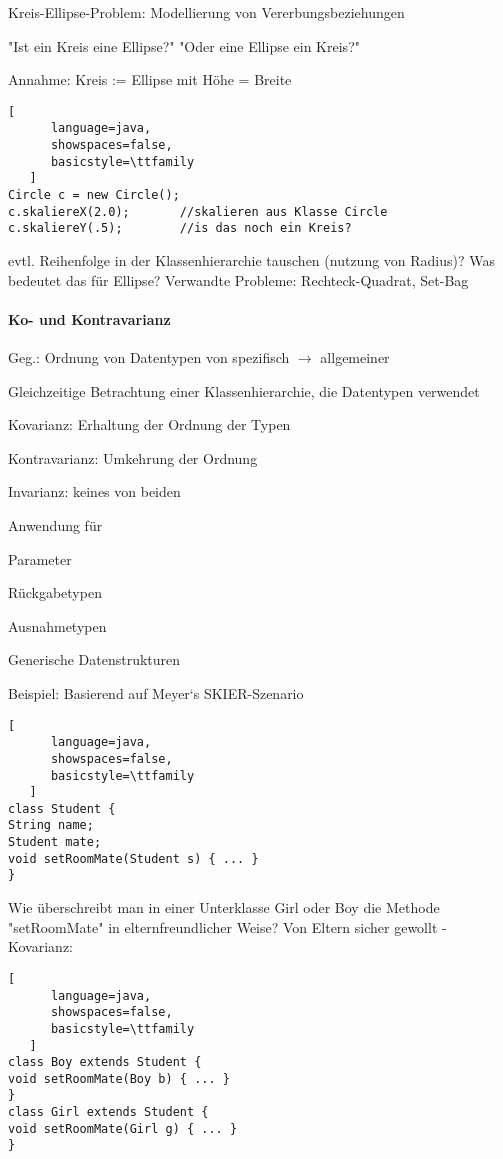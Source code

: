 \documentclass[10pt]{article}
\begin{document}
Kreis-Ellipse-Problem: Modellierung von Vererbungsbeziehungen
\begin{itemize*}
  \item "Ist ein Kreis eine Ellipse?" "Oder eine Ellipse ein Kreis?"
  \item Annahme: Kreis := Ellipse mit Höhe = Breite
\end{itemize*}
\begin{lstlisting}[
      language=java,
      showspaces=false,
      basicstyle=\ttfamily
   ]
Circle c = new Circle();  
c.skaliereX(2.0);       //skalieren aus Klasse Circle
c.skaliereY(.5);        //is das noch ein Kreis?
\end{lstlisting}

evtl. Reihenfolge in der Klassenhierarchie tauschen (nutzung von Radius)? Was bedeutet das für Ellipse?
Verwandte Probleme: Rechteck-Quadrat, Set-Bag

\paragraph{Ko- und Kontravarianz}
Geg.: Ordnung von Datentypen von spezifisch $\rightarrow$ allgemeiner
\begin{itemize*}
  \item Gleichzeitige Betrachtung einer Klassenhierarchie, die Datentypen verwendet
  \item Kovarianz: Erhaltung der Ordnung der Typen
  \item Kontravarianz: Umkehrung der Ordnung
  \item Invarianz: keines von beiden
  \item Anwendung für
  \begin{itemize*}
    \item Parameter
    \item Rückgabetypen
    \item Ausnahmetypen
    \item Generische Datenstrukturen
  \end{itemize*}
\end{itemize*}

Beispiel: Basierend auf Meyer‘s SKIER-Szenario
\begin{lstlisting}[
      language=java,
      showspaces=false,
      basicstyle=\ttfamily
   ]
class Student {
String name;
Student mate;
void setRoomMate(Student s) { ... }
}
\end{lstlisting}

Wie überschreibt man in einer Unterklasse Girl oder Boy die Methode "setRoomMate" in elternfreundlicher Weise? Von Eltern sicher gewollt - Kovarianz:
\begin{lstlisting}[
      language=java,
      showspaces=false,
      basicstyle=\ttfamily
   ]
class Boy extends Student {
void setRoomMate(Boy b) { ... }
}
class Girl extends Student {
void setRoomMate(Girl g) { ... }
}
\end{lstlisting}
\end{document}
